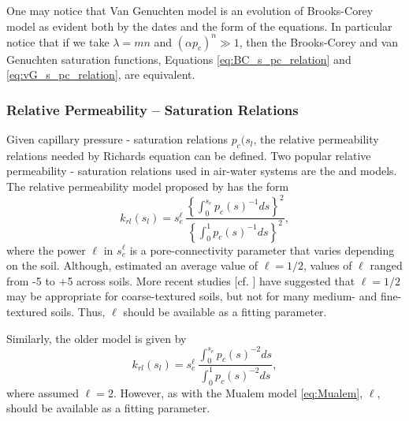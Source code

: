 One may notice that Van Genuchten model is an evolution of Brooks-Corey model as evident 
both by the dates and the form of the equations.
In particular notice that if we take 
$\lambda = mn$ and $(\alpha p_c)^n \gg 1$, 
then the Brooks-Corey and van Genuchten saturation functions, 
Equations \eqref{eq:BC_s_pc_relation} and \eqref{eq:vG_s_pc_relation}, are equivalent.


\subsubsection{Relative Permeability -- Saturation Relations}
\label{sec:richards-relative-permeability}

Given capillary pressure - saturation relations $p_c(s_l$, 
the relative permeability relations needed by Richards equation can be defined.  
Two popular relative permeability - saturation relations used in air-water 
systems are the \citet{mualem1976new} and \citet{burdine1953relative} models.
The relative permeability model proposed by \citet{mualem1976new} has the form
\begin{equation} \label{eq:Mualem}
  k_{rl}(s_l) 
  = 
  s_e^{\ell} \, 
  \frac{ \left\{ \displaystyle\int_0^{s_e} p_c(s)^{-1} ds \right\}^2 }
  { \left\{ \displaystyle\int_0^{1} p_c(s)^{-1} ds \right\}^2 },
\end{equation}
where the power $\ell$ in $s_e^\ell$ is a pore-connectivity parameter that varies 
depending on the soil. 
Although, \citet{mualem1976new} estimated an average value of
$\ell=1/2$, values of $\ell$ ranged from -5 to +5 across soils. More recent studies
[cf. \citet{vanG_retc_1991}] have suggested that $\ell=1/2$ may be
appropriate for coarse-textured soils, but not for many medium- and
fine-textured soils. Thus, $\ell$ should be available as a fitting parameter.

Similarly, the older \citet{burdine1953relative} model is given by
\begin{equation}
\label{eq:Burdine}
  k_{rl}(s_l) = s_e^{\ell} \, 
    \frac{ \displaystyle\int_0^{s_e} p_c(s)^{-2} ds }
         { \displaystyle\int_0^{1} p_c(s)^{-2} ds },
\end{equation}
where \citet{burdine1953relative} assumed $\ell=2$. However, as with
the Mualem model \eqref{eq:Mualem}, $\ell$, should be available as a
fitting parameter.


